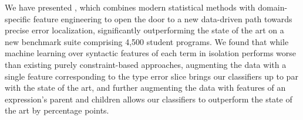 \label{sec:conclusion}

We have presented \toolname, which
combines modern statistical methods
with domain-specific feature engineering
to open the door to a new data-driven
path towards precise error localization,
significantly outperforming the
state of the art on a new benchmark
suite comprising 4,500 student programs.
%
%
We found that while machine learning
over syntactic features of each term in isolation
performs worse than existing
purely constraint-based approaches, %
augmenting the data with a single feature corresponding to
the type error slice brings our
classifiers up to par with the state of the art,
and further augmenting the data with
features of an expression's parent and children
allows our classifiers to outperform
the state of the art by \ToolnameWinSherrloc
percentage points.



